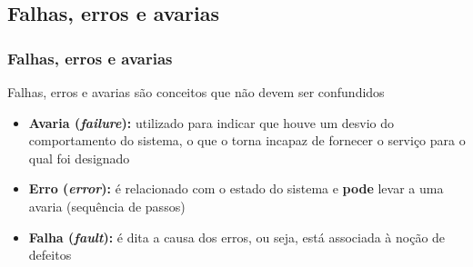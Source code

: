 \documentclass{beamer}
\begin{document}
\subsection{Falhas, erros e avarias}
\begin{frame}
    \frametitle{Falhas, erros e avarias}

    Falhas, erros e avarias são conceitos que não devem ser confundidos

\begin{itemize}
    \item \textbf{Avaria (\textit{failure}):} utilizado para indicar que houve
    um desvio do comportamento do sistema, o que o torna incapaz de fornecer o
    serviço para o qual foi designado
   
    \item \textbf{Erro (\textit{error}):} é relacionado com o estado do sistema
    e {\bf pode} levar a uma avaria (sequência de passos)
    
    \item \textbf{Falha (\textit{fault}):} é dita a causa dos erros, ou seja,
    está associada à noção de defeitos
\end{itemize}
\end{frame}

\end{document}
